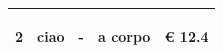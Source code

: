 \documentclass[a4paper]{article}
\begin{document}
\begin{tabular}{ | L{10mm} |  L{86mm} | L{12mm} | L{12mm} | L{16mm} | }
                            
                              \vspace{2.5mm}
                              \begin{spacing}{0}
                           2
                              \end{spacing} &
                              \vspace{2.5mm}
                              \begin{spacing}{0}
                           ciao
                              \end{spacing} &
                              \vspace{2.5mm}
                              \begin{spacing}{0}
                           -
                              \end{spacing} &
                              \vspace{2.5mm}
                              \begin{spacing}{0}
                           a corpo
                              \end{spacing} &
                              \vspace{2.5mm}
                              \begin{spacing}{0}
                                \euro\hfill 
                            12.4
                              \end{spacing} \\
                              \hline
            

\end{tabular}
\end{document}

